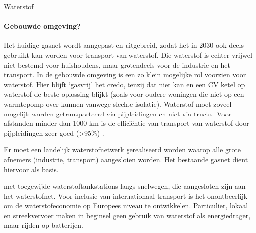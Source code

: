 \begin{voorstel}{Waterstof}
\begin{multicols*}{2}
\begin{overwegingen}
\paragraph{Gebouwde omgeving?}
Het huidige gasnet wordt aangepast en uitgebreid, zodat het in 2030 ook deels gebruikt kan worden voor transport van waterstof. Die waterstof is echter vrijwel niet bestemd voor huishoudens, maar grotendeels voor de industrie en het transport. In de gebouwde omgeving is een zo klein mogelijke rol voorzien voor waterstof. Hier blijft `gasvrij' het credo, tenzij dat niet kan en een CV ketel op waterstof de beste oplossing blijkt (zoals voor oudere woningen die niet op een warmtepomp over kunnen vanwege slechte isolatie). Waterstof moet zoveel mogelijk worden getransporteerd via pijpleidingen en niet via trucks. Voor afstanden minder dan 1000 km is de efficiëntie van transport van waterstof door pijpleidingen zeer goed (>95\%) \parencite{bossel_does_2006}.


\end{overwegingen}

\begin{aanbevelingen}

Er moet een landelijk waterstofnetwerk gerealiseerd worden waarop alle grote afnemers (industrie, transport) aangesloten worden. Het bestaande gasnet dient hiervoor als basis.

 met toegewijde waterstoftankstations langs snelwegen, die aangesloten zijn aan het waterstofnet. Voor inclusie van internationaal transport is het onontbeerlijk om de waterstofeconomie op Europees niveau te ontwikkelen. Particulier, lokaal en streekvervoer maken in beginsel geen gebruik van waterstof als energiedrager, maar rijden op batterijen.


\end{aanbevelingen}
\end{multicols*}
\end{voorstel}
